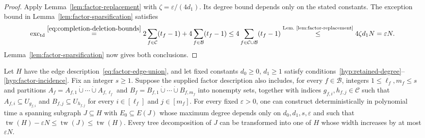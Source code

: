 \begin{proof}
Apply Lemma~\ref{lem:factor-replacement} with
$\zeta=\varepsilon/(4d_1)$. Its degree bound depends only on
the stated constants. The exception bound in
Lemma~\ref{lem:factor-sparsification} satisfies
\begin{equation}\label{eq:common-forest-exception-budget}
 \operatorname{exc}_{\mathrm{td}}
 \overset{\eqref{eq:completion-deletion-bounds}}{=}
 2\sum_{f\in\mathcal C}(t_f-1)+4\sum_{f\in\mathcal B}(t_f-1) \le4\sum_{f\in\mathcal C\cup\mathcal B}(t_f-1)
 \overset{\text{Lem.~\ref{lem:factor-replacement}}}{\leq}
 4\zeta d_1N=\varepsilon N.
\end{equation}
Lemma~\ref{lem:factor-sparsification} now gives both conclusions.
\end{proof}

\begin{theorem}
\label{thm:tw-sparsification}
Let $H$ have the edge description~\eqref{eq:factor-edge-union},
and let fixed constants $d_0\ge0$, $d_1\ge1$ satisfy
conditions~\ref{hyp:retained-degree}--\ref{hyp:factor-incidence}.
Fix an integer $s\ge1$. Suppose the supplied factor description also
includes, for every $f\in\mathcal B$, integers
$1\le\ell_f,m_f\le s$ and partitions
$A_f=A_{f,1}\mathbin{\dot\cup}\cdots\mathbin{\dot\cup}A_{f,\ell_f}$
and $B_f=B_{f,1}\mathbin{\dot\cup}\cdots\mathbin{\dot\cup}B_{f,m_f}$
into nonempty sets, together with indices
$g_{f,i},h_{f,j}\in\mathcal C$ such that
$A_{f,i}\subseteq U_{g_{f,i}}$ and $B_{f,j}\subseteq U_{h_{f,j}}$
for every $i\in[\ell_f]$ and $j\in[m_f]$.
For every fixed $\varepsilon>0$, one can construct deterministically
in polynomial time a spanning subgraph $J\subseteq H$ with
$E_0\subseteq E(J)$ whose maximum
degree depends only on $d_0,d_1,s,\varepsilon$ and such that
$\operatorname{tw}(H)-\varepsilon N
 \le\operatorname{tw}(J)\le\operatorname{tw}(H)$.
Every tree decomposition of $J$ can be transformed into one of
$H$ whose width increases by at most $\varepsilon N$.
\end{theorem}

